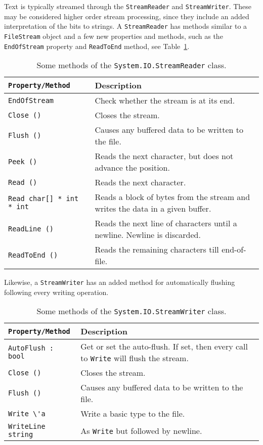Text is typically streamed through the \lstinline!StreamReader! and \lstinline!StreamWriter!. These may be considered higher order stream processing, since they include an added interpretation of the bits to strings. A \lstinline!StreamReader! has methods similar to a \lstinline!FileStream! object and a few new properties and methods, such as the \lstinline!EndOfStream! property and \lstinline!ReadToEnd! method, see Table~\ref{tab:streamReaderMethods}.
\begin{table}
  \centering
  \begin{tabularx}{\linewidth}{|l|X|}
    \hline
    \rowcolor{headerRowColor}\lstinline{Property/Method} & Description\\
    \hline
    \lstinline{EndOfStream} & Check whether the stream is at its end.\\
    \hline
    \lstinline{Close ()} & Closes the stream.\\
    \hline
    \lstinline{Flush ()} & Causes any buffered data to be written to the file.\\
    \hline
    \lstinline{Peek ()} & Reads the next character, but does not advance the position.\\
    \hline
    \lstinline{Read ()} & Reads the next character.\\
    \hline
    \lstinline{Read char[] * int * int} & Reads a block of bytes from the stream and writes the data in a given buffer.\\
    \hline
    \lstinline{ReadLine ()} & Reads the next line of characters until a newline. Newline is discarded.\\
    \hline
    \lstinline{ReadToEnd ()} & Reads the remaining characters till end-of-file.\\
    \hline
  \end{tabularx}
  \caption{Some methods of the \lstinline!System.IO.StreamReader! class.}
  \label{tab:streamReaderMethods}
\end{table}
Likewise, a \lstinline!StreamWriter! has an added method for automatically flushing following every writing operation.
\begin{table}
  \centering
  \begin{tabularx}{\linewidth}{|l|X|}
    \hline
    \rowcolor{headerRowColor}\lstinline{Property/Method} & Description\\
    \hline
    \lstinline{AutoFlush : bool} & Get or set the auto-flush. If set, then every call to \lstinline!Write! will flush the stream.\\
    \hline
    \lstinline{Close ()} & Closes the stream.\\
    \hline
    \lstinline{Flush ()} & Causes any buffered data to be written to the file.\\
    \hline
    \lstinline{Write \'a} & Write a basic type to the file.\\
    \hline
    \lstinline{WriteLine string} & As \lstinline!Write! but followed by newline.\\
    \hline
  \end{tabularx}
  \caption{Some methods of the \lstinline!System.IO.StreamWriter! class.}
  \label{tab:streamWriterMethods}
\end{table}
